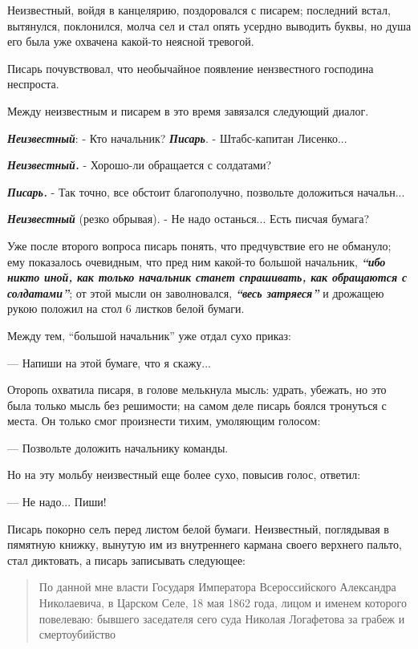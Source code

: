 Неизвестный, войдя в канцелярию, поздоровался с писарем; последний встал,
вытянулся, поклонился, молча сел и стал опять усердно выводить буквы, но душа
его была уже охвачена какой-то неясной тревогой.

Писарь почувствовал, что необычайное появление нензвестного господина
неспроста. 

Между неизвестным и писарем в это время завязался следующий диалог.

\textbf{\em Неизвестный}: - Кто начальник?
\textbf{\em Писарь}. - Штабс-капитан Лисенко...

\textbf{\em Неизвестный.} - Хорошо-ли обращается с солдатами?

\textbf{\em Писарь.} - Так точно, все обстоит благополучно, позвольте доложиться начальн...

\textbf{\em Неизвестный} (резко обрывая). - Не надо останься...  Есть писчая бумага?

Уже после второго вопроса писарь понять, что предчувствие его не обмануло; 
ему показалось очевидным, что пред ним какой-то большой начальник, \textbf{\em ``ибо никто иной,
как только начальник станет спрашивать, как обращаются с солдатами''}; от этой мысли он заволновался,
\textbf{\em ``весь затряеся''} и дрожащею рукою положил на стол 6 листков белой бумаги.

Между тем, ``большой начальник'' уже отдал сухо приказ:

— Напиши на этой бумаге, что я скажу...

Оторопь охватила писаря, в голове мелькнула мысль: удрать, убежать, но это была
только мысль без решимости; на самом деле писарь боялся тронуться с места. Он
только смог произнести тихим, умоляющим голосом:

— Позвольте доложить начальнику команды.

Но на эту мольбу неизвестный еще более сухо, повысив голос, ответил:

— Не надо... Пиши!

Писарь покорно селъ перед листом белой бумаги.  Неизвестный, поглядывая в
пямятную книжку, вынутую им из внутреннего кармана своего верхнего пальто, стал
диктовать, а писарь записывать следующее:

\begin{quote}
\em\bfseries

По данной мне власти Государя Императора Всероссийского Александра Николаевича,
в Царском Селе, 18 мая 1862 года, лицом и именем которого повелеваю:
бывшего заседателя сего суда Николая Логафетова за грабеж и
смертоубийство
\end{quote}

